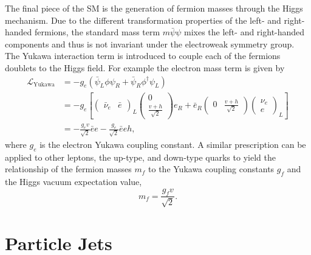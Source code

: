 The final piece of the \Gls{SM} is the generation of fermion masses through the Higgs mechanism.
Due to the different transformation properties of the left- and right-handed fermions, the standard mass term $m \bar \psi \psi$ mixes the left- and right-handed components and thus is not invariant under the electroweak symmetry group.
The Yukawa interaction term is introduced to couple each of the fermions doublets to the Higgs field.
For example the electron mass term is given by
\begin{equation}
    \label{eq:yukawa}
    \begin{split}
        \mathcal{L}_\text{Yukawa} & = -g_e( \bar \psi_L \phi \psi_R + \bar \psi_R \phi^\dagger \psi_L)    \\
                                  & = -g_e \left[
            \begin{pmatrix} \bar \nu_e & \bar e \end{pmatrix}_L \begin{pmatrix} 0 \\ \frac{v + h}{\sqrt{2}} \end{pmatrix} e_R
            + \bar e_R \begin{pmatrix} 0 & \frac{v + h}{\sqrt{2}} \end{pmatrix} \begin{pmatrix} \nu_e \\ e \end{pmatrix}_L
        \right]                                                                                           \\
                                  & = -\frac{g_e v}{\sqrt{2}} \bar e e - \frac{g_e}{\sqrt{2}} \bar e e h,
    \end{split}
\end{equation}
where $g_e$ is the electron Yukawa coupling constant.
A similar prescription can be applied to other leptons, the up-type, and down-type quarks to yield the relationship of the fermion masses $m_f$ to the Yukawa coupling constants $g_f$ and the Higgs vacuum expectation value,
\begin{equation}
    \label{eq:fermion_mass}
    m_f = \frac{g_f v}{\sqrt{2}}.
\end{equation}

\section{Particle Jets}
\label{sec:jets}

